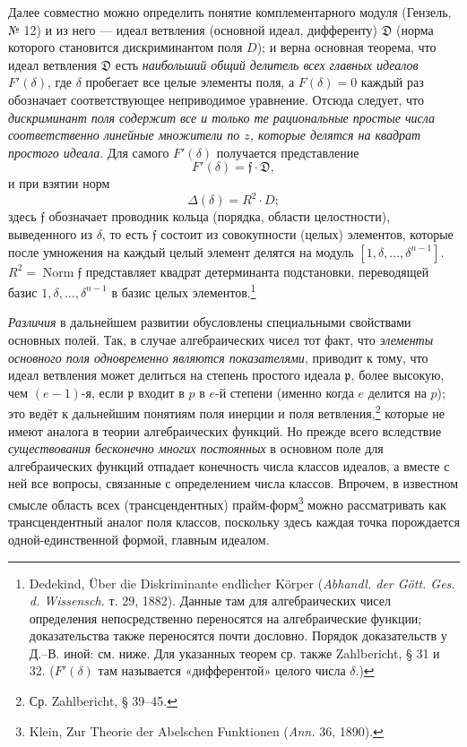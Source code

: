 \documentclass[11pt]{article}
\providecommand{\frD}{\mathfrak D}
\providecommand{\frf}{\mathfrak f}
\providecommand{\frp}{\mathfrak p}
\begin{document}
Далее совместно можно определить понятие комплементарного модуля (Гензель, № 12) и из него --- идеал ветвления (основной идеал, дифференту) \(\frD\) (норма которого становится дискриминантом поля \(D\)); и верна основная теорема, что идеал ветвления \(\frD\) есть \emph{наибольший общий делитель всех главных идеалов \(F'(\delta)\)}, где \(\delta\) пробегает все целые элементы поля, а \(F(\delta)=0\) каждый раз обозначает соответствующее неприводимое уравнение. Отсюда следует, что \emph{дискриминант поля содержит все и только те рациональные простые числа соответственно линейные множители по \(z\), которые делятся на квадрат простого идеала}. Для самого \(F'(\delta)\) получается представление
\[
F'(\delta)=\frf\cdot\frD,
\]
и при взятии норм
\[
\Delta(\delta)=R^2\cdot D;
\]
здесь \(\frf\) обозначает проводник кольца (порядка, области целостности), выведенного из \(\delta\), то есть \(\frf\) состоит из совокупности (целых) элементов, которые после умножения на каждый целый элемент делятся на модуль \([1,\delta,\ldots,\delta^{n-1}]\). \(R^2=\operatorname{Norm}\frf\) представляет квадрат детерминанта подстановки, переводящей базис \(1,\delta,\ldots,\delta^{n-1}\) в базис целых элементов.\footnote{Dedekind, Über die Diskriminante endlicher Körper (\emph{Abhandl. der Gött. Ges. d. Wissensch.} т. 29, 1882). Данные там для алгебраических чисел определения непосредственно переносятся на алгебраические функции; доказательства также переносятся почти дословно. Порядок доказательств у Д.--В. иной: см. ниже. Для указанных теорем ср. также Zahlbericht, § 31 и 32. (\(F'(\delta)\) там называется «дифферентой» целого числа \(\delta\).)}

\emph{Различия} в дальнейшем развитии обусловлены специальными свойствами основных полей. Так, в случае алгебраических чисел тот факт, что \emph{элементы основного поля одновременно являются показателями}, приводит к тому, что идеал ветвления может делиться на степень простого идеала \(\frp\), более высокую, чем \((e-1)\)-я, если \(\frp\) входит в \(p\) в \(e\)-й степени (именно когда \(e\) делится на \(p\)); это ведёт к дальнейшим понятиям поля инерции и поля ветвления,\footnote{Ср. Zahlbericht, § 39--45.} которые не имеют аналога в теории алгебраических функций. Но прежде всего вследствие \emph{существования бесконечно многих постоянных} в основном поле для алгебраических функций отпадает конечность числа классов идеалов, а вместе с ней все вопросы, связанные с определением числа классов. Впрочем, в известном смысле область всех (трансцендентных) прайм-форм\footnote{Klein, Zur Theorie der Abelschen Funktionen (\emph{Ann.} 36, 1890).} можно рассматривать как трансцендентный аналог поля классов, поскольку здесь каждая точка порождается одной-единственной формой, главным идеалом.
\end{document}
